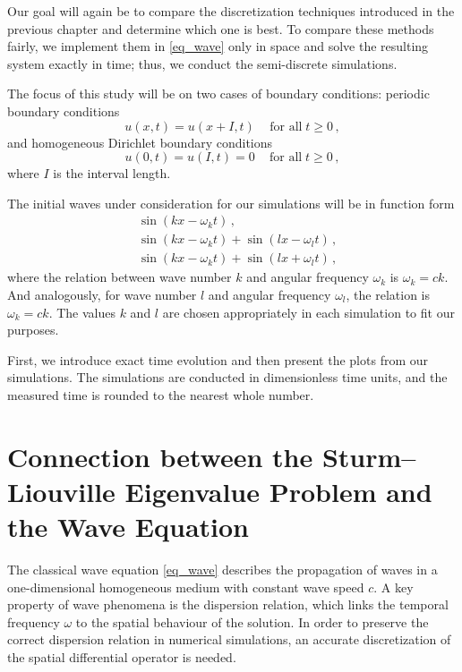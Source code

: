 \documentclass[11pt,a4paper,oneside,openright]{report} %
\begin{document}
Our goal will again be to compare the discretization techniques introduced in the previous chapter and determine which one is best. To compare these methods fairly, we implement them in \eqref{eq_wave} only in space and solve the resulting system exactly in time; thus, we conduct the semi-discrete simulations.

The focus of this study will be on two cases of boundary conditions: periodic boundary conditions
\begin{equation}
    u(x, t) = u(x + I, t) \,  \quad \text{for all} \; t \geq 0 \, ,
\end{equation}
and homogeneous Dirichlet boundary conditions
\begin{equation}
    u(0,  t) = u(I, t) = 0 \,  \quad \text{for all} \; t \geq 0 \, ,
\end{equation}
where $I$ is the interval length.

The initial waves under consideration for our simulations will be in function form
\begin{subequations}\label{eq_wave_general}
    \begin{align}
    & \sin{(kx - \omega_k t)} \, , \label{one_wave} \\[2pt]
    & \sin{(kx - \omega_k t)} + \sin{(lx - \omega_l t )} \, , \label{two_waves_same} \\[2pt]
    & \sin{(kx - \omega_k t)} + \sin{(lx + \omega_l t )} \, , \label{two_waves_oppo}
    \end{align}
\end{subequations}
where the relation between wave number $k$ and angular frequency $\omega_k$ is $\omega_k = c  k$. And analogously, for wave number $l$ and angular frequency $\omega_l$, the relation is $\omega_k = c  k$. The values $k$ and $l$ are chosen appropriately in each simulation to fit our purposes.

First, we introduce exact time evolution and then present the plots from our simulations. The simulations are conducted in dimensionless time units, and the measured time is rounded to the nearest whole number.

\section{Connection between the Sturm--Liouville Eigenvalue Problem and the Wave Equation}
\noindent
The classical wave equation \eqref{eq_wave} describes the propagation of waves in a one-dimensional homogeneous medium with constant wave speed $c$. A key property of wave phenomena is the dispersion relation, which links the temporal frequency $\omega$ to the spatial behaviour of the solution. In order to preserve the correct dispersion relation in numerical simulations, an accurate discretization of the spatial differential operator is needed.
\end{document}
